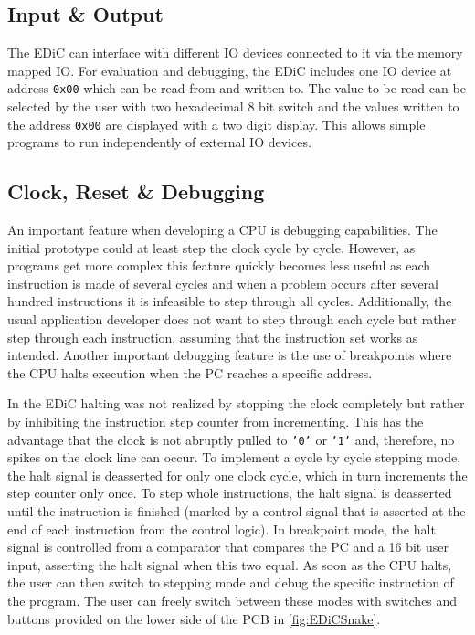 \subsection{Input \& Output}\label{sec:IO}
The \gls{EDiC} can interface with different \gls{IO} devices connected to it via the memory mapped \gls{IO}.
For evaluation and debugging, the \gls{EDiC} includes one \gls{IO} device at address \texttt{0x00} which can be read from and written to.
The value to be read can be selected by the user with two hexadecimal 8 bit switch and the values written to the address \texttt{0x00} are displayed with a two digit display.
This allows simple programs to run independently of external \gls{IO} devices.

\subsection{Clock, Reset \& Debugging}\label{sec:clock}
An important feature when developing a \gls{CPU} is debugging capabilities.
The initial prototype could at least step the clock cycle by cycle.
However, as programs get more complex this feature quickly becomes less useful as each instruction is made of several cycles and when a problem occurs after several hundred instructions it is infeasible to step through all cycles.
Additionally, the usual application developer does not want to step through each cycle but rather step through each instruction, assuming that the instruction set works as intended.
Another important debugging feature is the use of breakpoints where the \gls{CPU} halts execution when the \gls{PC} reaches a specific address.

In the \gls{EDiC} halting was not realized by stopping the clock completely but rather by inhibiting the instruction step counter from incrementing.
This has the advantage that the clock is not abruptly pulled to \texttt{'0'} or \texttt{'1'} and, therefore, no spikes on the clock line can occur.
To implement a cycle by cycle stepping mode, the halt signal is deasserted for only one clock cycle, which in turn increments the step counter only once.
To step whole instructions, the halt signal is deasserted until the instruction is finished (marked by a control signal that is asserted at the end of each instruction from the control logic).
In breakpoint mode, the halt signal is controlled from a comparator that compares the \gls{PC} and a 16 bit user input, asserting the halt signal when this two equal.
As soon as the \gls{CPU} halts, the user can then switch to stepping mode and debug the specific instruction of the program.
The user can freely switch between these modes with switches and buttons provided on the lower side of the \gls{PCB} in \cref{fig:EDiCSnake}.

